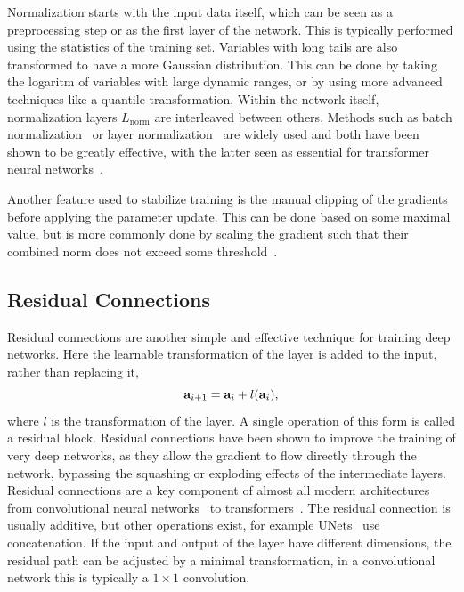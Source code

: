 Normalization starts with the input data itself, which can be seen as a preprocessing step or as the first layer of the network.
This is typically performed using the statistics of the training set.
Variables with long tails are also transformed to have a more Gaussian distribution.
This can be done by taking the logaritm of variables with large dynamic ranges, or by using more advanced techniques like a quantile transformation.
Within the network itself, normalization layers $L_{\text{norm}}$ are interleaved between others.
Methods such as batch normalization~\cite{BatchNorm} or layer normalization~\cite{LayerNorm} are widely used and both have been shown to be greatly effective, with the latter seen as essential for transformer neural networks~\cite{Attention}.

Another feature used to stabilize training is the manual clipping of the gradients before applying the parameter update.
This can be done based on some maximal value, but is more commonly done by scaling the gradient such that their combined norm does not exceed some threshold~\cite{WhyGradientClipping}.

\subsection{Residual Connections}

Residual connections are another simple and effective technique for training deep networks.
Here the learnable transformation of the layer is added to the input, rather than replacing it,
\begin{equation}
    \mathbf{a}_{i+1} = \mathbf{a}_i + l(\mathbf{a}_i),
\end{equation}
where $l$ is the transformation of the layer.
A single operation of this form is called a residual block.
Residual connections have been shown to improve the training of very deep networks, as they allow the gradient to flow directly through the network, bypassing the squashing or exploding effects of the intermediate layers.
Residual connections are a key component of almost all modern architectures from convolutional neural networks~\cite{ResNet} to transformers~\cite{Attention}.
The residual connection is usually additive, but other operations exist, for example UNets~\cite{UNet} use concatenation.
If the input and output of the layer have different dimensions, the residual path can be adjusted by a minimal transformation, in a convolutional network this is typically a $1 \times 1$ convolution.

